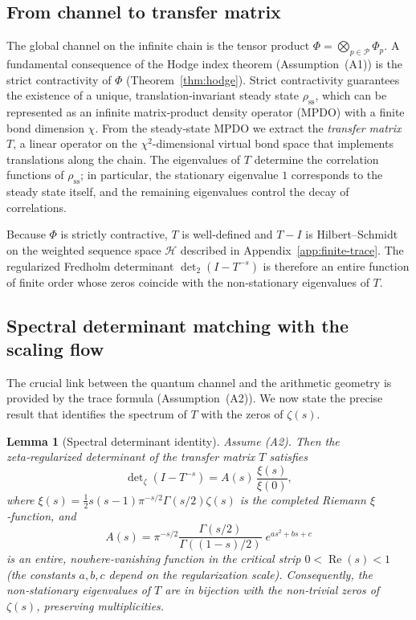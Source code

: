 \documentclass[11pt,a4paper]{article}
\newtheorem{lemma}{Lemma}
\begin{document}
\subsection{From channel to transfer matrix}
\label{sec:from-channel-to-T}

The global channel on the infinite chain is the tensor product $\Phi = \bigotimes_{p\in\mathcal{P}}\Phi_p$.  A fundamental consequence of the Hodge index theorem (Assumption~(A1)) is the strict contractivity of $\Phi$ (Theorem~\ref{thm:hodge}).  Strict contractivity guarantees the existence of a unique, translation‑invariant steady state $\rho_{\mathrm{ss}}$, which can be represented as an infinite matrix‑product density operator (MPDO) with a finite bond dimension $\chi$.  From the steady‑state MPDO we extract the \emph{transfer matrix} $T$, a linear operator on the $\chi^2$-dimensional virtual bond space that implements translations along the chain.  The eigenvalues of $T$ determine the correlation functions of $\rho_{\mathrm{ss}}$; in particular, the stationary eigenvalue $1$ corresponds to the steady state itself, and the remaining eigenvalues control the decay of correlations.

Because $\Phi$ is strictly contractive, $T$ is well‑defined and $T-I$ is Hilbert–Schmidt on the weighted sequence space $\mathcal{H}$ described in Appendix~\ref{app:finite-trace}.  The regularized Fredholm determinant $\det\nolimits_2(I-T^{-s})$ is therefore an entire function of finite order whose zeros coincide with the non‑stationary eigenvalues of $T$.

\subsection{Spectral determinant matching with the scaling flow}
\label{sec:determinant-matching}

The crucial link between the quantum channel and the arithmetic geometry is provided by the trace formula (Assumption~(A2)).  We now state the precise result that identifies the spectrum of $T$ with the zeros of $\zeta(s)$.

\begin{lemma}[Spectral determinant identity]\label{lem:det}
Assume (A2).  Then the zeta‑regularized determinant of the transfer matrix $T$ satisfies
\[
\det\nolimits_{\zeta}(I - T^{-s}) = A(s)\,\frac{\xi(s)}{\xi(0)},
\]
where $\xi(s)=\frac12 s(s-1)\pi^{-s/2}\Gamma(s/2)\zeta(s)$ is the completed Riemann $\xi$‑function, and
\[
A(s) = \pi^{-s/2}\frac{\Gamma(s/2)}{\Gamma((1-s)/2)}\;e^{a s^2+b s+c}
\]
is an entire, nowhere‑vanishing function in the critical strip $0<\operatorname{Re}(s)<1$ (the constants $a,b,c$ depend on the regularization scale).  Consequently, the non‑stationary eigenvalues of $T$ are in bijection with the non‑trivial zeros of $\zeta(s)$, preserving multiplicities.
\end{lemma}
\end{document}
